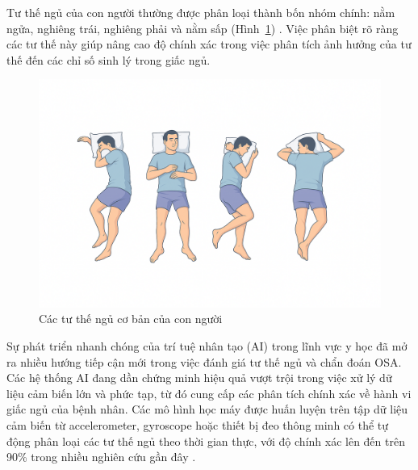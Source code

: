 Tư thế ngủ của con người thường được phân loại thành bốn nhóm chính: nằm ngửa, nghiêng trái, nghiêng phải và nằm sấp (Hình~\ref{4_tuthe}) \cite{4_ngu}. Việc phân biệt rõ ràng các tư thế này giúp nâng cao độ chính xác trong việc phân tích ảnh hưởng của tư thế đến các chỉ số sinh lý trong giấc ngủ.

\begin{figure}
		\centering
 		\includegraphics[width=\textwidth]{images/4ngu.png}
 		\vspace*{-7mm}
		\caption{Các tư thế ngủ cơ bản của con người}
		\label{4_tuthe}
\end{figure}


Sự phát triển nhanh chóng của trí tuệ nhân tạo (AI) trong lĩnh vực y học đã mở ra nhiều hướng tiếp cận mới trong việc đánh giá tư thế ngủ và chẩn đoán OSA. Các hệ thống AI đang dần chứng minh hiệu quả vượt trội trong việc xử lý dữ liệu cảm biến lớn và phức tạp, từ đó cung cấp các phân tích chính xác về hành vi giấc ngủ của bệnh nhân. Các mô hình học máy được huấn luyện trên tập dữ liệu cảm biến từ accelerometer, gyroscope hoặc thiết bị đeo thông minh có thể tự động phân loại các tư thế ngủ theo thời gian thực, với độ chính xác lên đến trên 90\% trong nhiều nghiên cứu gần đây \cite{Sleep_Posture_Detection}\cite{Vu2025SleepPosition}\cite{HOANG2025116309}. 

